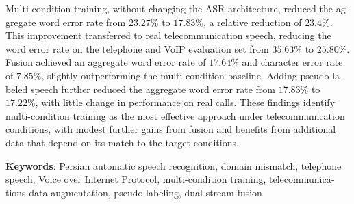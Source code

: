 \begin{latin}
Multi-condition training, without changing the ASR architecture, reduced the aggregate word error rate from $23.27\%$ to $17.83\%$, a relative reduction of $23.4\%$. This improvement transferred to real telecommunication speech, reducing the word error rate on the telephone and VoIP evaluation set from $35.63\%$ to $25.80\%$. Fusion achieved an aggregate word error rate of $17.64\%$ and character error rate of $7.85\%$, slightly outperforming the multi-condition baseline. Adding pseudo-labeled speech further reduced the aggregate word error rate from $17.83\%$ to $17.22\%$, with little change in performance on real calls. These findings identify multi-condition training as the most effective approach under telecommunication conditions, with modest further gains from fusion and benefits from additional data that depend on its match to the target conditions.

\bigskip\noindent\textbf{Keywords}:
Persian automatic speech recognition, domain mismatch, telephone speech, Voice over Internet Protocol, multi-condition training, telecommunications data augmentation, pseudo-labeling, dual-stream fusion

\end{latin}
